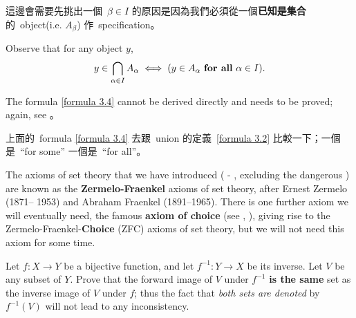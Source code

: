 \begin{note}
這邊會需要先挑出一個\ \(\beta \in I\) 的原因是因為我們必須從一個\textbf{已知是集合}的\ object(i.e. \(A_{\beta}\)) 作\ specification。
\end{note}

Observe that for any object \(y\),
\begin{align} \label{formula 3.4}
    y \in \bigcap_{\alpha \in I} A_{\alpha} \iff (y \in A_{\alpha} \text{\ \textbf{for all} \(\alpha \in I\))}.
\end{align}

\begin{note}
The formula \ref{formula 3.4} cannot be derived directly and needs to be proved; again, see 。
\end{note}

\begin{note}
上面的\ formula \ref{formula 3.4} 去跟\ union 的定義\ \ref{formula 3.2} 比較一下；一個是\ ``for some'' 一個是\ ``for all''。
\end{note}

\begin{remark}
The axioms of set theory that we have introduced ( - , excluding the dangerous ) are known as the \textbf{Zermelo-Fraenkel} axioms of set theory, after Ernest Zermelo (1871– 1953) and Abraham Fraenkel (1891–1965).
There is one further axiom we will eventually need, the famous \textbf{axiom of choice} (see , ), giving rise to the Zermelo-Fraenkel-\textbf{Choice} (ZFC) axioms of set theory,
but we will not need this axiom for some time.
\end{remark}

\exercisesection

\begin{exercise} \label{exercise 3.4.1}
Let \(f : X \to Y\) be a bijective function, and let \(f^{-1} : Y \to X\) be its inverse.
Let \(V\) be any subset of \(Y\).
Prove that the forward image of \(V\) under \(f^{-1}\) \textbf{is the same} set as the inverse image of \(V\) under \(f\);
thus the fact that \emph{both sets are denoted} by \(f^{-1}(V)\) will not lead to any inconsistency.
\end{exercise}

